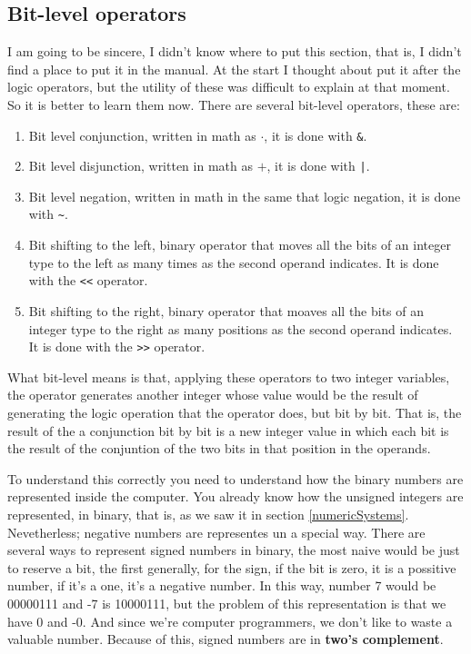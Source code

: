 \documentclass[a4paper]{article}
\begin{document}
\subsection{Bit-level operators}
I am going to be sincere, I didn't know where to put this section, that is,
I didn't find a place to put it in the manual. At the start I thought about put
it after the logic operators, but the utility of these was difficult to explain
at that moment. So it is better to learn them now. There are several bit-level
operators, these are:
\begin{enumerate}
\item Bit level conjunction, written in math as $\cdot$, it is done with
\verb!&!.
\item Bit level disjunction, written in math as $+$, it is done with \verb!|!.
\item Bit level negation, written in math in the same that logic negation,
it is done with \verb!~!.
\item Bit shifting to the left, binary operator that moves all the bits of
an integer type to the left as many times as the second operand indicates.
It is done with the \verb!<<! operator.
\item Bit shifting to the right, binary operator that moaves all the bits of
an integer type to the right as many positions as the second operand indicates.
It is done with the \verb!>>! operator.
\end{enumerate}
What bit-level means is that, applying these operators to two integer variables,
the operator generates another integer whose value would be the result of
generating the logic operation that the operator does, but bit by bit. That is,
the result of the a conjunction bit by bit is a new integer value in which each
bit is the result of the conjuntion of the two bits in that position in the
operands.

To understand this correctly you need to understand how the binary numbers are
represented inside the computer. You already know how the unsigned integers are
represented, in binary, that is, as we saw it in section \ref{numericSystems}.
Nevetherless; negative numbers are representes un a special way. There are
several ways to represent signed numbers in binary, the most naive would be just
to reserve a bit, the first generally, for the sign, if the bit is zero, it is a
possitive number, if it's a one, it's a negative number. In this way, number
7 would be 00000111 and -7 is 10000111, but the problem of this representation
is that we have 0 and -0. And since we're computer programmers, we don't like to
waste a valuable number. Because of this, signed numbers are in
\textbf{two's complement}.
\end{document}
